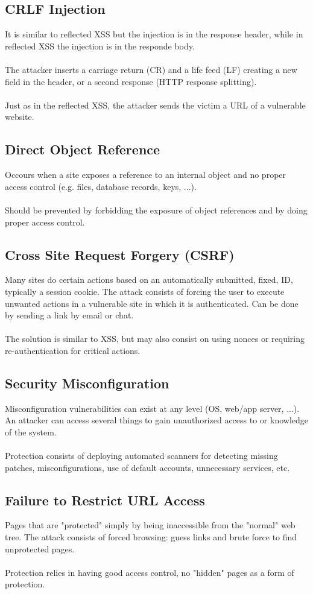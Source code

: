 \documentclass[10pt,a4paper]{report}
\begin{document}
\subsection{CRLF Injection}
It is similar to reflected XSS but the injection is in the response header, while in reflected XSS the injection is in the responde body.\\
\\
The attacker inserts a carriage return (CR) and a life feed (LF) creating a new field in the header, or a second response (HTTP response splitting).\\
\\
Just as in the reflected XSS, the attacker sends the victim a URL of a vulnerable website.
\subsection{Direct Object Reference}
Occours when a site exposes a reference to an internal object and no proper access control (e.g. files, database records, keys, ...).\\
\\
Should be prevented by forbidding the exposure of object references and by doing proper access control.
\subsection{Cross Site Request Forgery (CSRF)}
Many sites do certain actions based on an automatically submitted, fixed, ID, typically a session cookie. The attack consists of forcing the user to execute unwanted actions in a vulnerable site in which it is authenticated. Can be done by sending a link by email or chat.\\
\\
The solution is similar to XSS, but may also consist on using nonces or requiring re-authentication for critical actions.
\subsection{Security Misconfiguration}
Misconfiguration vulnerabilities can exist at any level (OS, web/app server, ...). An attacker can access several things to gain unauthorized access to or knowledge of the system.\\
\\
Protection consists of deploying automated scanners  for detecting missing patches, misconfigurations, use of default accounts, unnecessary services, etc.
\subsection{Failure to Restrict URL Access}
Pages that are "protected" simply by being inaccessible from the "normal" web tree. The attack consists of forced browsing: guess links and brute force to find unprotected pages.\\
\\
Protection relies in having good access control, no "hidden" pages as a form of protection.
\end{document}
